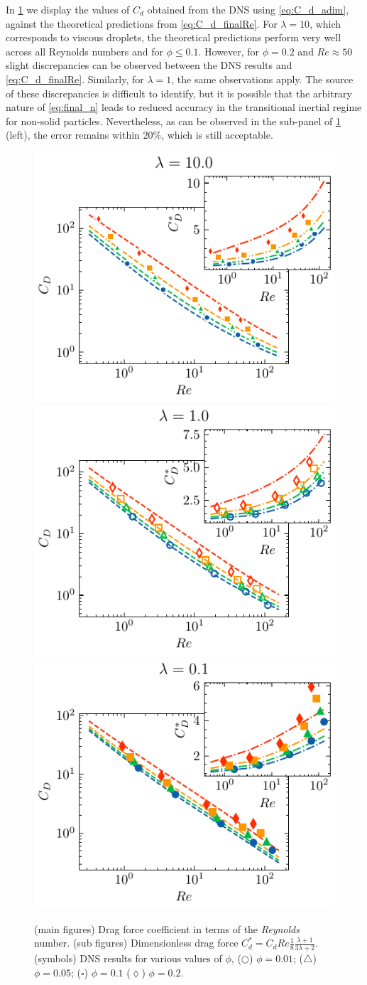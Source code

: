 In \ref{fig:cp} we display the values of $C_d$ obtained from the DNS using \ref{eq:C_d_adim}, against the theoretical predictions from \ref{eq:C_d_finalRe}. 
For $\lambda = 10$, which corresponds to viscous droplets, the theoretical predictions perform very well across all Reynolds numbers and for $\phi \le 0.1$. 
However, for $\phi = 0.2$ and $Re \approx 50$ slight discrepancies can be observed between the DNS results and \eqref{eq:C_d_finalRe}. 
Similarly, for $\lambda = 1$, the same observations apply. 
The source of these discrepancies is difficult to identify, but it is possible that the arbitrary nature of \ref{eq:final_n} leads to reduced accuracy in the transitional inertial regime for non-solid particles.
Nevertheless, as can be observed in the sub-panel of \ref{fig:cp} (left), the error remains within $20\%$, which is still acceptable.  
\begin{figure}[h!]
    \centering
    \includegraphics[height = 0.3\textwidth]{image/HOMOGENEOUS_final/CA/Cp_l_10.pdf}
    \includegraphics[height = 0.3\textwidth]{image/HOMOGENEOUS_final/CA/Cp_l_1.pdf}
    \includegraphics[height = 0.3\textwidth]{image/HOMOGENEOUS_final/CA/Cp_l_0.pdf}
    \caption{
        (main figures)
        Drag force coefficient in terms of the \textit{Reynolds} number. 
        (sub figures) Dimensionless drag force $C_d^* =C_d Re \frac{1}{8}\frac{\lambda+1}{3\lambda +2}$. 
        (symbols) DNS results for various values of $\phi$, 
        ($\pmb\bigcirc$) $\phi = 0.01$; ($\pmb\triangle$) $ \phi = 0.05$; ($\pmb\square$) $\phi = 0.1$ ($\pmb\lozenge$) $\phi = 0.2$.
        }
    \label{fig:cp}
\end{figure}


